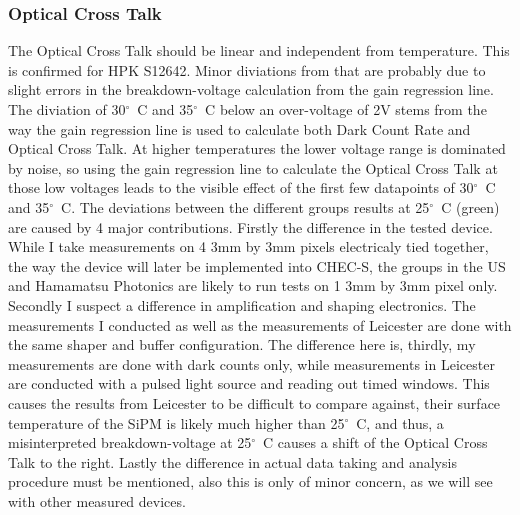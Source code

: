 \documentclass[12pt,article,type=msc,colorback,accentcolor=tud9c]{tudthesis}
\begin{document}
\begin{figure}[h]
\begin{centering}
\caption{}
\label{fig:}
\end{centering}
\end{figure}




\subsubsection{Optical Cross Talk}
The Optical Cross Talk should be linear and independent from temperature. This is confirmed for HPK S12642. Minor diviations from that are probably due to slight errors in the breakdown-voltage calculation from the gain regression line. The diviation of 30${^\circ}$~C and 35${^\circ}$~C below an over-voltage of 2V stems from the way the gain regression line is used to calculate both Dark Count Rate and Optical Cross Talk. At higher temperatures the lower voltage range is dominated by noise, so using the gain regression line to calculate the Optical Cross Talk at those low voltages leads to the visible effect of the first few datapoints of 30${^\circ}$~C and 35${^\circ}$~C. 
The deviations between the different groups results at 25${^\circ}$~C (green) are caused by 4 major contributions. Firstly the difference in the tested device. While I take measurements on 4 3mm by 3mm pixels electricaly tied together, the way the device will later be implemented into CHEC-S, the groups in the US and Hamamatsu Photonics are likely to run tests on 1 3mm by 3mm pixel only. Secondly I suspect a difference in amplification and shaping electronics. The measurements I conducted as well as the measurements of Leicester are done with the same shaper and buffer configuration. The difference here is, thirdly, my measurements are done with dark counts only, while measurements in Leicester are conducted with a pulsed light source and reading out timed windows. This causes the results from Leicester to be difficult to compare against, their surface temperature of the SiPM is likely much higher than 25${^\circ}$~C, and thus, a misinterpreted breakdown-voltage at 25${^\circ}$~C causes a shift of the Optical Cross Talk to the right. Lastly the difference in actual data taking and analysis procedure must be mentioned, also this is only of minor concern, as we will see with other measured devices.
\end{document}
